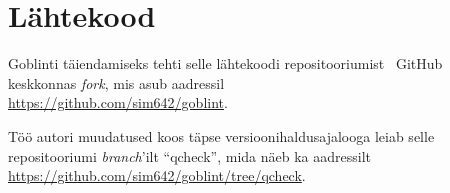 \documentclass[../thesis.tex]{subfiles}
\begin{document}
\section{Lähtekood}
\label{app:lahtekood}

Goblinti täiendamiseks tehti selle lähtekoodi repositooriumist~\cite{goblint_repo} GitHub keskkonnas \textit{fork}, mis asub aadressil \\
\indent \url{https://github.com/sim642/goblint}.

\noindent Töö autori muudatused koos täpse versioonihaldusajalooga leiab selle repositooriumi \textit{branch}'ilt \enquote{qcheck}, mida näeb ka aadressilt \\
\indent \url{https://github.com/sim642/goblint/tree/qcheck}.

\end{document}
